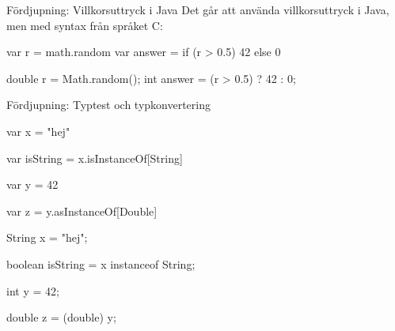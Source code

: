 \begin{Slide}{Fördjupning: Villkorsuttryck i Java}\SlideFontSmall
Det går att använda villkorsuttryck i Java, men med syntax från språket C:
\begin{multicols}{2}
\begin{CodeSmall}[basicstyle=\ttfamily\SlideFontSize{6}{8}]
var r = math.random
var answer = if (r > 0.5) 42 else 0
\end{CodeSmall}

\columnbreak

\begin{CodeSmall}[language=Java,basicstyle=\ttfamily\SlideFontSize{6}{8}]
double r = Math.random();
int answer = (r > 0.5) ? 42 : 0;
\end{CodeSmall}
\end{multicols}

\end{Slide}




\begin{Slide}{Fördjupning: Typtest och typkonvertering}

\begin{multicols}{2}
\begin{CodeSmall}[basicstyle=\ttfamily\SlideFontSize{6}{8}]
var x = "hej"

var isString = x.isInstanceOf[String]

var y = 42

var z = y.asInstanceOf[Double]

\end{CodeSmall}

\columnbreak

\begin{CodeSmall}[language=Java,basicstyle=\ttfamily\SlideFontSize{6}{8}]
String x = "hej";

boolean isString = x instanceof String;

int y = 42;

double z = (double) y;
\end{CodeSmall}
\end{multicols}


\end{Slide}



